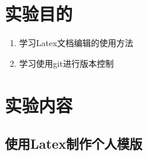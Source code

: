 \documentclass[12pt,a4paper,UTF8]{article}
\begin{document}
    \tableofcontents
    \newpage

    \NoBgThispage
    \section{实验目的}
    \begin{enumerate}    
        \item 学习Latex文档编辑的使用方法
        \item 学习使用git进行版本控制
    \end{enumerate}
    
    \section{实验内容}
    \subsection{使用Latex制作个人模版}
\end{document}
